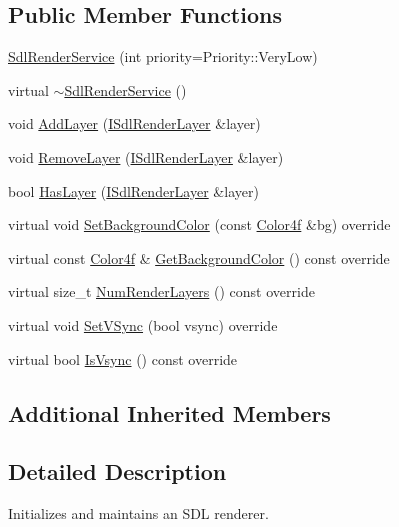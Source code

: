 \subsection*{Public Member Functions}
\begin{DoxyCompactItemize}
\item 
\hyperlink{classastu_1_1SdlRenderService_a4ec0b0ae88700604b6c6502ba56b8e09}{Sdl\+Render\+Service} (int priority=Priority\+::\+Very\+Low)
\item 
virtual \hyperlink{classastu_1_1SdlRenderService_a0ec8c27982cfa6ace6b28e50fba78f2a}{$\sim$\+Sdl\+Render\+Service} ()
\item 
void \hyperlink{classastu_1_1SdlRenderService_a94b8e424f9e7332cc5c81051196b43f7}{Add\+Layer} (\hyperlink{classastu_1_1ISdlRenderLayer}{I\+Sdl\+Render\+Layer} \&layer)
\item 
void \hyperlink{classastu_1_1SdlRenderService_ae275d41459e82b5e7cf6636b2b2f868a}{Remove\+Layer} (\hyperlink{classastu_1_1ISdlRenderLayer}{I\+Sdl\+Render\+Layer} \&layer)
\item 
bool \hyperlink{classastu_1_1SdlRenderService_afe973840da86bd8cdf1b703cdd642529}{Has\+Layer} (\hyperlink{classastu_1_1ISdlRenderLayer}{I\+Sdl\+Render\+Layer} \&layer)
\item 
virtual void \hyperlink{classastu_1_1SdlRenderService_a1b92671271fa91f44e7b3e6c57bebe54}{Set\+Background\+Color} (const \hyperlink{classastu_1_1Color}{Color4f} \&bg) override
\item 
virtual const \hyperlink{classastu_1_1Color}{Color4f} \& \hyperlink{classastu_1_1SdlRenderService_ae6e14e9be46ab88a1e04fa6ac7c5aa2c}{Get\+Background\+Color} () const override
\item 
virtual size\+\_\+t \hyperlink{classastu_1_1SdlRenderService_a45305851abdc94c0d9c8441822a59cd2}{Num\+Render\+Layers} () const override
\item 
virtual void \hyperlink{classastu_1_1SdlRenderService_a4887120e1595f4b257e4813e09121e89}{Set\+V\+Sync} (bool vsync) override
\item 
virtual bool \hyperlink{classastu_1_1SdlRenderService_a3bcc49339bca8cd388c16caefb18cadf}{Is\+Vsync} () const override
\end{DoxyCompactItemize}
\subsection*{Additional Inherited Members}


\subsection{Detailed Description}
Initializes and maintains an S\+DL renderer.

